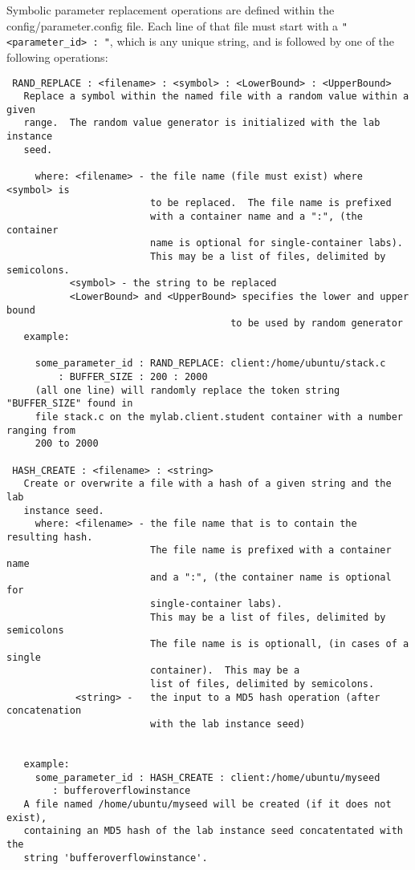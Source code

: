 \documentclass[12pt]{article}
\begin{document}
Symbolic parameter replacement operations are defined within the config/parameter.config file.
Each line of that file must start with a \verb!"<parameter_id> : "!, which is any unique string, and
is followed by one of the following operations:

\begin{verbatim}
 RAND_REPLACE : <filename> : <symbol> : <LowerBound> : <UpperBound>
   Replace a symbol within the named file with a random value within a given
   range.  The random value generator is initialized with the lab instance
   seed.

     where: <filename> - the file name (file must exist) where <symbol> is 
                         to be replaced.  The file name is prefixed 
                         with a container name and a ":", (the container 
                         name is optional for single-container labs).  
                         This may be a list of files, delimited by semicolons. 
           <symbol> - the string to be replaced
           <LowerBound> and <UpperBound> specifies the lower and upper bound
                                       to be used by random generator
   example:

     some_parameter_id : RAND_REPLACE: client:/home/ubuntu/stack.c 
         : BUFFER_SIZE : 200 : 2000
     (all one line) will randomly replace the token string "BUFFER_SIZE" found in
     file stack.c on the mylab.client.student container with a number ranging from 
     200 to 2000
 
 HASH_CREATE : <filename> : <string>
   Create or overwrite a file with a hash of a given string and the lab 
   instance seed.
     where: <filename> - the file name that is to contain the resulting hash.
                         The file name is prefixed with a container name 
                         and a ":", (the container name is optional for 
                         single-container labs).  
                         This may be a list of files, delimited by semicolons 
                         The file name is is optionall, (in cases of a single
                         container).  This may be a 
                         list of files, delimited by semicolons.
            <string> -   the input to a MD5 hash operation (after concatenation 
                         with the lab instance seed)
                       
                   
   example:
     some_parameter_id : HASH_CREATE : client:/home/ubuntu/myseed 
        : bufferoverflowinstance
   A file named /home/ubuntu/myseed will be created (if it does not exist), 
   containing an MD5 hash of the lab instance seed concatentated with the 
   string 'bufferoverflowinstance'.
 

\end{verbatim}
\end{document}
